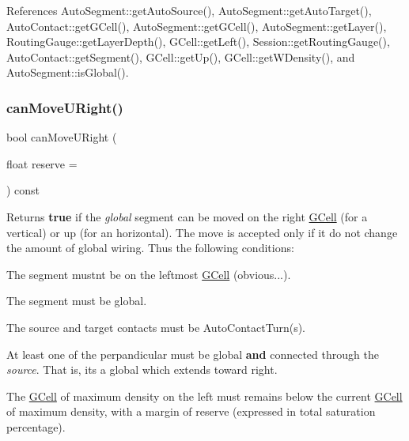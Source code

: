 References Auto\+Segment\+::get\+Auto\+Source(), Auto\+Segment\+::get\+Auto\+Target(), Auto\+Contact\+::get\+G\+Cell(), Auto\+Segment\+::get\+G\+Cell(), Auto\+Segment\+::get\+Layer(), Routing\+Gauge\+::get\+Layer\+Depth(), G\+Cell\+::get\+Left(), Session\+::get\+Routing\+Gauge(), Auto\+Contact\+::get\+Segment(), G\+Cell\+::get\+Up(), G\+Cell\+::get\+W\+Density(), and Auto\+Segment\+::is\+Global().

\mbox{\label{classKatabatic_1_1AutoVertical_ad0c972e34d6bac47bd9276a7d6e053d8}} 
\subsubsection{\texorpdfstring{can\+Move\+U\+Right()}{canMoveURight()}}
{\footnotesize\ttfamily bool can\+Move\+U\+Right (\begin{DoxyParamCaption}\item[{float}]{reserve = {} }\end{DoxyParamCaption}) const\hspace{0.3cm}{\ttfamily [virtual]}}

\begin{DoxyReturn}{Returns}
{\bfseries true} if the {\itshape global} segment can be moved on the right \hyperlink{classKatabatic_1_1GCell}{G\+Cell} (for a vertical) or up (for an horizontal). The move is accepted only if it do not change the amount of global wiring. Thus the following conditions\+:
\begin{DoxyItemize}
\item The segment mustn\textquotesingle{}t be on the leftmost \hyperlink{classKatabatic_1_1GCell}{G\+Cell} (obvious...).
\item The segment must be global.
\item The source and target contacts must be Auto\+Contact\+Turn(s).
\item At least one of the perpandicular must be global {\bfseries and} connected through the {\itshape source}. That is, it\textquotesingle{}s a global which extends toward right.
\item The \hyperlink{classKatabatic_1_1GCell}{G\+Cell} of maximum density on the left must remains below the current \hyperlink{classKatabatic_1_1GCell}{G\+Cell} of maximum density, with a margin of {\ttfamily reserve} (expressed in total saturation percentage). 
\end{DoxyItemize}
\end{DoxyReturn}


